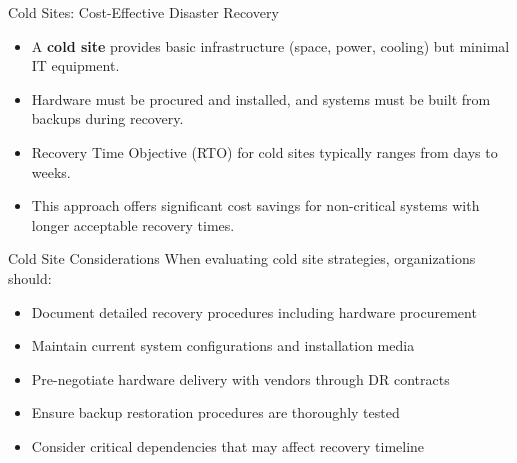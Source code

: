 \documentclass{beamer}
\begin{document}
\begin{frame}{Cold Sites: Cost-Effective Disaster Recovery}
    \begin{itemize}
        \item A \textbf{cold site} provides basic infrastructure (space, power, cooling) but minimal IT equipment.
        \item Hardware must be procured and installed, and systems must be built from backups during recovery.
        \item Recovery Time Objective (RTO) for cold sites typically ranges from days to weeks.
        \item This approach offers significant cost savings for non-critical systems with longer acceptable recovery times.
    \end{itemize}
    
    \begin{block}{Cold Site Considerations}
        When evaluating cold site strategies, organizations should:
        \small
        \begin{itemize}
            \item Document detailed recovery procedures including hardware procurement
            \item Maintain current system configurations and installation media
            \item Pre-negotiate hardware delivery with vendors through DR contracts
            \item Ensure backup restoration procedures are thoroughly tested
            \item Consider critical dependencies that may affect recovery timeline
        \end{itemize}
    \end{block}
\end{frame}
\end{document}
